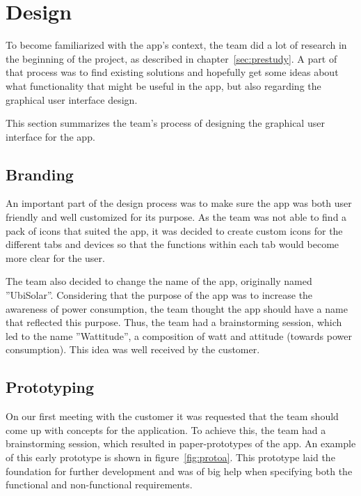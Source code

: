\section{Design}
To become familiarized with the app's context, the team did a lot of research in the beginning of the project, as described in chapter~\ref{sec:prestudy}. A part of that process was to find existing solutions and hopefully get some ideas about what functionality that might be useful in the app, but also regarding the graphical user interface design.

This section summarizes the team's process of designing the graphical user interface for the app.

\subsection{Branding}
An important part of the design process was to make sure the app was both user friendly and well customized for its purpose. As the team was not able to find a pack of icons that suited the app, it was decided to create custom icons for the different tabs and devices so that the functions within each tab would become more clear for the user.

The team also decided to change the name of the app, originally named ''UbiSolar''. Considering that the purpose of the app was to increase the awareness of power consumption, the team thought the app should have a name that reflected this purpose. Thus, the team had a brainstorming session, which led to the name ''Wattitude'', a composition of watt and attitude (towards power consumption). This idea was well received by the customer.

\subsection{Prototyping}
On our first meeting with the customer it was requested that the team should come up with concepts for the application. To achieve this, the team had a brainstorming session, which resulted in paper-prototypes of the app. An example of this early prototype is shown in figure~\ref{fig:protoa}. This prototype laid the foundation for further development and was of big help when specifying both the functional and non-functional requirements.

